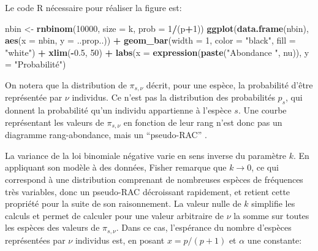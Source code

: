\documentclass[
  11pt,
  french,
  a4paper,
  extrafontsizes,onecolumn,openright
  ]{memoir}
\newenvironment{Shaded}{\begin{snugshade}}{\end{snugshade}}
\newcommand{\DataTypeTok}[1]{\textcolor[rgb]{0.13,0.29,0.53}{#1}}
\newcommand{\DecValTok}[1]{\textcolor[rgb]{0.00,0.00,0.81}{#1}}
\newcommand{\FloatTok}[1]{\textcolor[rgb]{0.00,0.00,0.81}{#1}}
\newcommand{\KeywordTok}[1]{\textcolor[rgb]{0.13,0.29,0.53}{\textbf{#1}}}
\newcommand{\NormalTok}[1]{#1}
\newcommand{\OperatorTok}[1]{\textcolor[rgb]{0.81,0.36,0.00}{\textbf{#1}}}
\newcommand{\StringTok}[1]{\textcolor[rgb]{0.31,0.60,0.02}{#1}}
\begin{document}
\normalsize

Le code R nécessaire pour réaliser la figure est:

\scriptsize

\begin{Shaded}
\begin{Highlighting}[]
\NormalTok{nbin <-}\StringTok{ }\KeywordTok{rnbinom}\NormalTok{(}\DecValTok{10000}\NormalTok{, }\DataTypeTok{size =}\NormalTok{ k, }\DataTypeTok{prob =} \DecValTok{1}\OperatorTok{/}\NormalTok{(p}\OperatorTok{+}\DecValTok{1}\NormalTok{))}
\KeywordTok{ggplot}\NormalTok{(}\KeywordTok{data.frame}\NormalTok{(nbin), }\KeywordTok{aes}\NormalTok{(}\DataTypeTok{x =}\NormalTok{ nbin, }\DataTypeTok{y =}\NormalTok{ ..prop..)) }\OperatorTok{+}\StringTok{ }
\StringTok{  }\KeywordTok{geom_bar}\NormalTok{(}\DataTypeTok{width =} \DecValTok{1}\NormalTok{, }\DataTypeTok{color =} \StringTok{"black"}\NormalTok{, }\DataTypeTok{fill =} \StringTok{"white"}\NormalTok{) }\OperatorTok{+}
\StringTok{  }\KeywordTok{xlim}\NormalTok{(}\OperatorTok{-}\FloatTok{0.5}\NormalTok{, }\DecValTok{50}\NormalTok{) }\OperatorTok{+}
\StringTok{  }\KeywordTok{labs}\NormalTok{(}\DataTypeTok{x =} \KeywordTok{expression}\NormalTok{(}\KeywordTok{paste}\NormalTok{(}\StringTok{"Abondance "}\NormalTok{, nu)), }\DataTypeTok{y =} \StringTok{"Probabilité"}\NormalTok{)}
\end{Highlighting}
\end{Shaded}

\normalsize

On notera que la distribution de \({\pi}_{s,\nu}\) décrit, pour une espèce, la probabilité d'être représentée par \(\nu\) individus.
Ce n'est pas la distribution des probabilités \(p_s\), qui donnent la probabilité qu'un individu appartienne à l'espèce \(s\).
Une courbe représentant les valeurs de \({\pi}_{s,\nu}\) en fonction de leur rang n'est donc pas un diagramme rang-abondance, mais un ``pseudo-RAC'' \autocite{Izsak2012}.

La variance de la loi binomiale négative varie en sens inverse du paramètre \(k\).
En appliquant son modèle à des données, Fisher remarque que \(k \to 0\), ce qui correspond à une distribution comprenant de nombreuses espèces de fréquences très variables, donc un pseudo-RAC décroissant rapidement, et retient cette propriété pour la suite de son raisonnement.
La valeur nulle de \(k\) simplifie les calculs et permet de calculer pour une valeur arbitraire de \(\nu\) la somme sur toutes les espèces des valeurs de \({\pi}_{s,\nu}\).
Dans ce cas, l'espérance du nombre d'espèces représentées par \(\nu\) individus est, en posant \(x=p/(p+1)\) et \(\alpha\) une constante:
\end{document}
